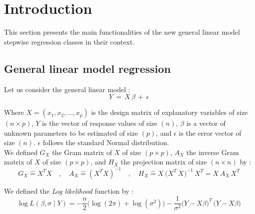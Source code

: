 %

\section{Introduction}

This section presents the main functionalities of the new general linear model stepwise regression classes in their context.\\

\subsection{General linear model regression}

Let us consider the general linear model : 
\begin{equation}
\boxed{
Y \,=\, X \,\beta\, +\, \epsilon }
\end{equation}


Where $X=(x_1,x_2,\dots,x_p)$ is the design matrix of explanatory variables of size $(n \times p)$,
$Y$ is the vector of response values of size $(n)$, 
$\beta $ is a vector of unknown parameters to be estimated of size $(p)$, 
and $\epsilon $ is the error vector of size $(n)$. $\epsilon$ follows the standard Normal distribution.\\


We defined $G_X$ the Gram matrix of $X$ of size $(p\times p)$, $A_X$ the inverse Gram matrix of $X$ of size $(p\times p)$, 
and $H_X$ the projection matrix of size $(n\times n)$ by :
\begin{equation}
G_X \hat{=}X^T X  \quad,\quad  A_X \hat{=}(X^T X)^{-1}  \quad,\quad 
H_X \hat{=} X_{}\,\big(X^T_{} \,X_{}\big)^{-1} \,X^T_{}  =  X_{}\,A_X \,X^T_{}
 \end{equation}

We defined the {\it Log likelihood} function by : 
\begin{equation}
\log L(\beta,\sigma\mid Y)= -\frac{n}{2}\big(\log(2\pi)+ \log(\sigma^2)\big)- \frac{1}{\sigma^2}\big(Y-X\beta\big)^T\,\big(Y-X\beta\big)
\end{equation}

